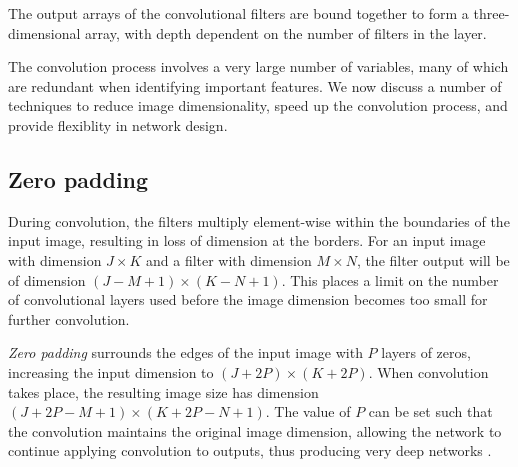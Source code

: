 

The output arrays of the convolutional filters are bound together to form a three-dimensional array, with depth dependent on the number of filters in the layer.

The convolution process involves a very large number of variables, many of which are redundant when identifying important features. We now discuss a number of techniques to reduce image dimensionality, speed up the convolution process, and provide flexiblity in network design.

\subsection*{Zero padding}\label{convnets-pad}

During convolution, the filters multiply element-wise within the boundaries of the input image, resulting in loss of dimension at the borders. For an input image with dimension $J \times K$ and a filter with dimension $M \times N$, the filter output will be of dimension $(J - M + 1)\times (K - N + 1)$. This places a limit on the number of convolutional layers used before the image dimension becomes too small for further convolution.

\textit{Zero padding} surrounds the edges of the input image with $P$ layers of zeros, increasing the input dimension to  $(J+2P) \times (K+2P)$. When convolution takes place, the resulting image size has dimension $(J+2P - M + 1) \times (K + 2P - N + 1)$. The value of $P$ can be set such that the convolution maintains the original image dimension, allowing the network to continue applying convolution to outputs, thus producing very deep networks \citep{GoogLeNet2015}.

